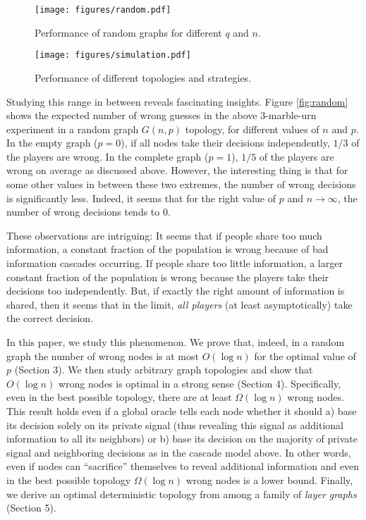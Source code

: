 \documentclass[a4paper,UKenglish]{lipics}
\theoremstyle{definition}
\begin{document}
\begin{figure}
	\begin{minipage}{2in}
    		\texttt{[image: figures/random.pdf]}
		\caption{Performance of random graphs for different $q$ and $n$.}
		\label{fig:random}
	\end{minipage}
	\hspace{1in}
	\begin{minipage}{2in}
		\texttt{[image: figures/simulation.pdf]}
		\caption{Performance of different topologies and strategies.}
		\label{fig:simulation}
	\end{minipage}
\end{figure}

Studying this range in between reveals fascinating insights. 
Figure \ref{fig:random} shows the expected number of wrong guesses 
	in the above 3-marble-urn experiment in a random graph $G(n,p)$ topology, 
	for different values of $n$ and $p$. 
In the empty graph ($p=0$), if all nodes take their decisions independently, $1/3$ of the players are wrong. 
In the complete graph ($p=1$), $1/5$ of the players are wrong on average as discussed above. 
However, the interesting thing is that for some other values in between these two extremes,
	the number of wrong decisions is significantly less. 
Indeed, it seems that for the right value of $p$ and $n\rightarrow\infty$, the number of wrong decisions tends to $0$. 

These observations are intriguing: 
	It seems that if people share too much information, 
	a constant fraction of the population is wrong because of bad information cascades occurring. 
If people share too little information, 
	a larger constant fraction of the population is wrong because the players take their decisions too independently. 
But, if exactly the right amount of information is shared, 
	then it seems that in the limit, \emph{all players} (at least asymptotically) take the correct decision. 

In this paper, we study this phenomenon. 
We prove that, indeed, in a random graph the number of wrong nodes is at most $O(\log n)$ for the optimal value of $p$ (Section 3). 
We then study arbitrary graph topologies and show that $O(\log n)$ wrong nodes is optimal in a strong sense (Section 4). 
Specifically, even in the best possible topology, there are at least $\Omega(\log n)$ wrong nodes. 
This result holds even if a global oracle tells each node whether it should 
	a) base its decision solely on its private signal (thus revealing this signal as additional information to all its neighbors) or 
	b) base its decision on the majority of private signal and neighboring decisions as in the cascade model above. 
In other words, even if nodes can ``sacrifice'' themselves to reveal additional information 
	and even in the best possible topology $\Omega(\log n)$ wrong nodes is a lower bound. 
Finally, we derive an optimal deterministic topology from among a family of \emph{layer graphs} (Section 5).
\end{document}
